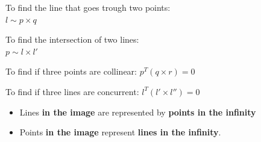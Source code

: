To find the line that goes trough two points:\\
$l \sim p \times q$

To find the intersection of two lines:\\
$p \sim l \times l'$

To find if three points are collinear:
$p^T (q \times r) = 0$

To find if three lines are concurrent:
$l^T (l' \times l'') = 0$

\begin{itemize}
  \item Lines \textbf{in the image} are represented by \textbf{points in
    the infinity}
  \item Points \textbf{in the image} represent \textbf{lines in the
    infinity}.
\end{itemize}

